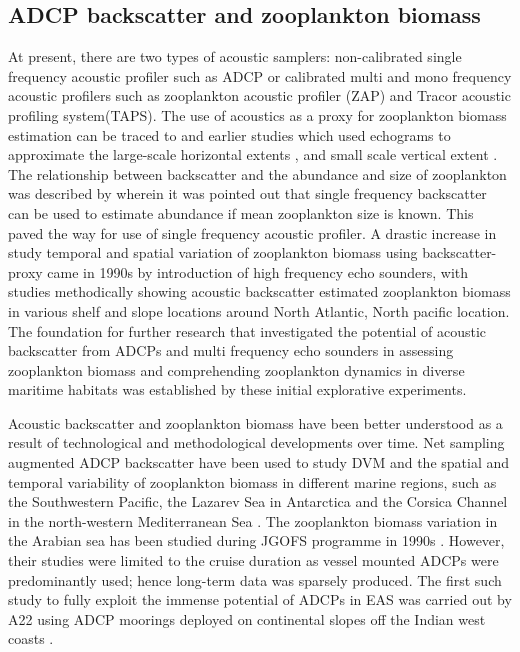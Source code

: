 \documentclass{article}
\begin{document}
	\subsection{ADCP backscatter and zooplankton biomass}
	At present, there are two types of acoustic samplers: non-calibrated single frequency acoustic profiler such as ADCP or calibrated multi and mono frequency acoustic profilers such as zooplankton acoustic profiler (ZAP) and Tracor acoustic profiling system(TAPS). The use of acoustics as a proxy for zooplankton biomass estimation can be traced to \citet{pieper1971study, sameoto1977use} and earlier studies which used echograms to approximate the large-scale horizontal extents \citep{barraclough1969shallow}, and small scale vertical extent \citep{mcnaught1968acoustical}. The relationship between backscatter and the abundance and size of zooplankton was described by \citet{greenlaw1979acoustical} 
	wherein it was pointed out that single frequency backscatter can be used to estimate abundance if mean zooplankton size is known. This paved the way for use of single frequency acoustic profiler. A drastic increase in study temporal and spatial variation of zooplankton biomass using  backscatter-proxy came in 1990s by introduction of high frequency echo sounders, with studies \citep{flagg1989use, wiebe1990sound, batchelder00981, greene1998three, rippeth1998diur} methodically showing acoustic backscatter estimated zooplankton biomass in various shelf and slope locations around  North Atlantic, North pacific location. The foundation for further research that investigated the potential of acoustic backscatter from ADCPs and multi frequency echo sounders in assessing zooplankton biomass and comprehending zooplankton dynamics in diverse maritime habitats was established by these initial explorative experiments.
	
	 Acoustic backscatter and zooplankton biomass have been better understood as a result of technological and methodological developments over time. Net sampling augmented ADCP backscatter have been used to study DVM and the spatial and temporal variability of zooplankton biomass in different marine regions, such as the Southwestern Pacific, the Lazarev Sea in Antarctica and the Corsica Channel in the north-western Mediterranean Sea \citep{cisewski2010seasonal,hamilton2013links,smeti2015spatial, guerra2019zooplankton}.	The zooplankton biomass variation in the Arabian sea has been studied during JGOFS programme in 1990s \citep{herring1998across, nair1999arabian, fielding2004biological, smith2005mesozooplankton}. However, their studies were limited to the cruise duration as vessel mounted ADCPs were predominantly used; hence long-term data was sparsely produced. The first such study to fully exploit the immense potential of ADCPs in EAS was carried out by A22 using ADCP moorings deployed on continental slopes off the Indian west coasts \citep{amol2014observed, chaudhuri2020observed}.
	
\end{document}

